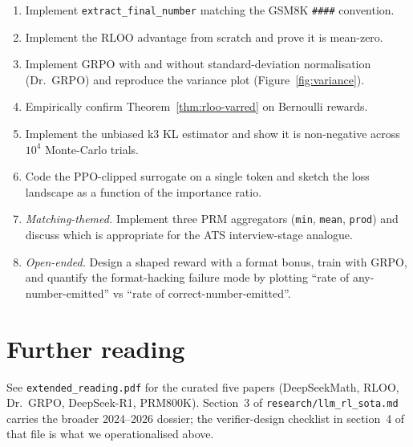 \documentclass[11pt,oneside]{scrbook}
\begin{document}
\begin{enumerate}\setlength{\itemsep}{2pt}
  \item[\textbf{\textcolor{rlteal}{$\bigstar$}}]
        Implement \texttt{extract\_final\_number} matching the GSM8K
        \verb|####| convention.
  \item[\textbf{\textcolor{rlteal}{$\bigstar\bigstar$}}]
        Implement the RLOO advantage from scratch and prove it is mean-zero.
  \item[\textbf{\textcolor{rlteal}{$\bigstar\bigstar$}}]
        Implement GRPO with and without standard-deviation normalisation
        (Dr.~GRPO) and reproduce the variance plot
        (Figure~\ref{fig:variance}).
  \item[\textbf{\textcolor{rlteal}{$\bigstar\bigstar$}}]
        Empirically confirm Theorem~\ref{thm:rloo-varred} on Bernoulli rewards.
  \item[\textbf{\textcolor{rlteal}{$\bigstar\bigstar$}}]
        Implement the unbiased k3 KL estimator and show it is non-negative
        across $10^4$ Monte-Carlo trials.
  \item[\textbf{\textcolor{rlteal}{$\bigstar\bigstar$}}]
        Code the PPO-clipped surrogate on a single token and sketch the
        loss landscape as a function of the importance ratio.
  \item[\textbf{\textcolor{rlteal}{$\bigstar\bigstar$}}]
        \emph{Matching-themed.} Implement three PRM aggregators
        (\texttt{min}, \texttt{mean}, \texttt{prod}) and discuss which is
        appropriate for the ATS interview-stage analogue.
  \item[\textbf{\textcolor{rlteal}{$\bigstar\bigstar\bigstar$}}]
        \emph{Open-ended.} Design a shaped reward with a format bonus,
        train with GRPO, and quantify the format-hacking failure mode by
        plotting ``rate of any-number-emitted'' vs ``rate of
        correct-number-emitted''.
\end{enumerate}

\chapter{Further reading}

See \texttt{extended\_reading.pdf} for the curated five papers (DeepSeekMath,
RLOO, Dr.~GRPO, DeepSeek-R1, PRM800K). Section~3 of
\texttt{research/llm\_rl\_sota.md} carries the broader 2024--2026 dossier;
the verifier-design checklist in section~4 of that file is what we
operationalised above.
\end{document}
